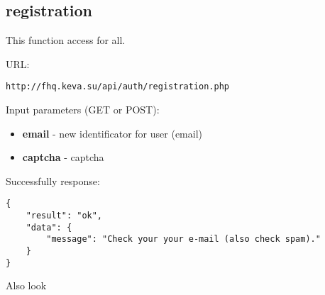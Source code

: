 \subsection{registration}
\par

This function access for all.

URL:
\begin{Verbatim}[frame=single]
http://fhq.keva.su/api/auth/registration.php
\end{Verbatim}

Input parameters (GET or POST):
\begin{itemize}
  \item \textbf{email} - new identificator for user (email)
  \item \textbf{captcha} - captcha
\end{itemize}

Successfully response:  \\
\begin{Verbatim}[frame=single]
{
    "result": "ok",
    "data": {
        "message": "Check your your e-mail (also check spam)."
    }
}
\end{Verbatim}

Also look ~
